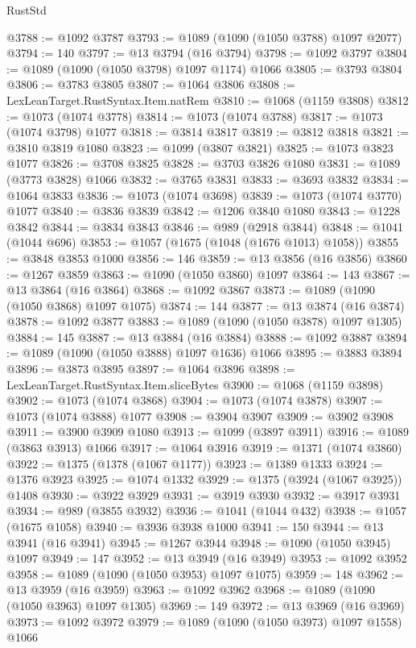 \begin{lexlean}{RustStd}
\begin{coremodule}
{\begin{coremodule}
{{{{{{{{{{{{{{@3788 := @1092 @3787
@3793 := @1089 (@1090 (@1050 @3788) @1097 @2077)
@3794 := 140
@3797 := @13 @3794 (@16 @3794)
@3798 := @1092 @3797
@3804 := @1089 (@1090 (@1050 @3798) @1097 @1174) @1066
@3805 := @3793 @3804
@3806 := @3783 @3805
@3807 := @1064 @3806
@3808 := LexLeanTarget.RustSyntax.Item.natRem
@3810 := @1068 (@1159 @3808)
@3812 := @1073 (@1074 @3778)
@3814 := @1073 (@1074 @3788)
@3817 := @1073 (@1074 @3798) @1077
@3818 := @3814 @3817
@3819 := @3812 @3818
@3821 := @3810 @3819 @1080
@3823 := @1099 (@3807 @3821)
@3825 := @1073 @3823 @1077
@3826 := @3708 @3825
@3828 := @3703 @3826 @1080
@3831 := @1089 (@3773 @3828) @1066
@3832 := @3765 @3831
@3833 := @3693 @3832
@3834 := @1064 @3833
@3836 := @1073 (@1074 @3698)
@3839 := @1073 (@1074 @3770) @1077
@3840 := @3836 @3839
@3842 := @1206 @3840 @1080
@3843 := @1228 @3842
@3844 := @3834 @3843
@3846 := @989 (@2918 @3844)
@3848 := @1041 (@1044 @696)
@3853 := @1057 (@1675 (@1048 (@1676 @1013) @1058))
@3855 := @3848 @3853 @1000
@3856 := 146
@3859 := @13 @3856 (@16 @3856)
@3860 := @1267 @3859
@3863 := @1090 (@1050 @3860) @1097
@3864 := 143
@3867 := @13 @3864 (@16 @3864)
@3868 := @1092 @3867
@3873 := @1089 (@1090 (@1050 @3868) @1097 @1075)
@3874 := 144
@3877 := @13 @3874 (@16 @3874)
@3878 := @1092 @3877
@3883 := @1089 (@1090 (@1050 @3878) @1097 @1305)
@3884 := 145
@3887 := @13 @3884 (@16 @3884)
@3888 := @1092 @3887
@3894 := @1089 (@1090 (@1050 @3888) @1097 @1636) @1066
@3895 := @3883 @3894
@3896 := @3873 @3895
@3897 := @1064 @3896
@3898 := LexLeanTarget.RustSyntax.Item.sliceBytes
@3900 := @1068 (@1159 @3898)
@3902 := @1073 (@1074 @3868)
@3904 := @1073 (@1074 @3878)
@3907 := @1073 (@1074 @3888) @1077
@3908 := @3904 @3907
@3909 := @3902 @3908
@3911 := @3900 @3909 @1080
@3913 := @1099 (@3897 @3911)
@3916 := @1089 (@3863 @3913) @1066
@3917 := @1064 @3916
@3919 := @1371 (@1074 @3860)
@3922 := @1375 (@1378 (@1067 @1177))
@3923 := @1389 @1333
@3924 := @1376 @3923
@3925 := @1074 @1332
@3929 := @1375 (@3924 (@1067 @3925)) @1408
@3930 := @3922 @3929
@3931 := @3919 @3930
@3932 := @3917 @3931
@3934 := @989 (@3855 @3932)
@3936 := @1041 (@1044 @432)
@3938 := @1057 (@1675 @1058)
@3940 := @3936 @3938 @1000
@3941 := 150
@3944 := @13 @3941 (@16 @3941)
@3945 := @1267 @3944
@3948 := @1090 (@1050 @3945) @1097
@3949 := 147
@3952 := @13 @3949 (@16 @3949)
@3953 := @1092 @3952
@3958 := @1089 (@1090 (@1050 @3953) @1097 @1075)
@3959 := 148
@3962 := @13 @3959 (@16 @3959)
@3963 := @1092 @3962
@3968 := @1089 (@1090 (@1050 @3963) @1097 @1305)
@3969 := 149
@3972 := @13 @3969 (@16 @3969)
@3973 := @1092 @3972
@3979 := @1089 (@1090 (@1050 @3973) @1097 @1558) @1066
}}}}}}}}}}}}}}
\end{coremodule}}
\end{coremodule}
\end{lexlean}
